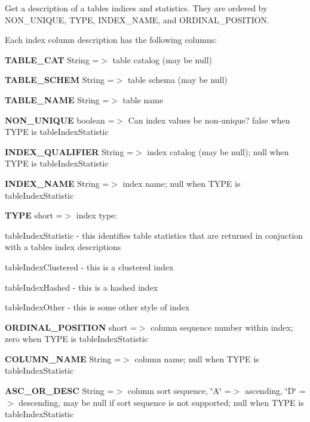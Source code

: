 Get a description of a table\textquotesingle{}s indices and statistics. They are ordered by N\+O\+N\+\_\+\+U\+N\+I\+Q\+UE, T\+Y\+PE, I\+N\+D\+E\+X\+\_\+\+N\+A\+ME, and O\+R\+D\+I\+N\+A\+L\+\_\+\+P\+O\+S\+I\+T\+I\+ON. 

Each index column description has the following columns\+: 
\begin{DoxyEnumerate}
\item {\bfseries T\+A\+B\+L\+E\+\_\+\+C\+AT} String =$>$ table catalog (may be null) 
\item {\bfseries T\+A\+B\+L\+E\+\_\+\+S\+C\+H\+EM} String =$>$ table schema (may be null) 
\item {\bfseries T\+A\+B\+L\+E\+\_\+\+N\+A\+ME} String =$>$ table name 
\item {\bfseries N\+O\+N\+\_\+\+U\+N\+I\+Q\+UE} boolean =$>$ Can index values be non-\/unique? false when T\+Y\+PE is table\+Index\+Statistic 
\item {\bfseries I\+N\+D\+E\+X\+\_\+\+Q\+U\+A\+L\+I\+F\+I\+ER} String =$>$ index catalog (may be null); null when T\+Y\+PE is table\+Index\+Statistic 
\item {\bfseries I\+N\+D\+E\+X\+\_\+\+N\+A\+ME} String =$>$ index name; null when T\+Y\+PE is table\+Index\+Statistic 
\item {\bfseries T\+Y\+PE} short =$>$ index type\+: 
\begin{DoxyItemize}
\item table\+Index\+Statistic -\/ this identifies table statistics that are returned in conjuction with a table\textquotesingle{}s index descriptions 
\item table\+Index\+Clustered -\/ this is a clustered index 
\item table\+Index\+Hashed -\/ this is a hashed index 
\item table\+Index\+Other -\/ this is some other style of index 
\end{DoxyItemize}
\item {\bfseries O\+R\+D\+I\+N\+A\+L\+\_\+\+P\+O\+S\+I\+T\+I\+ON} short =$>$ column sequence number within index; zero when T\+Y\+PE is table\+Index\+Statistic 
\item {\bfseries C\+O\+L\+U\+M\+N\+\_\+\+N\+A\+ME} String =$>$ column name; null when T\+Y\+PE is table\+Index\+Statistic 
\item {\bfseries A\+S\+C\+\_\+\+O\+R\+\_\+\+D\+E\+SC} String =$>$ column sort sequence, \char`\"{}\+A\char`\"{} =$>$ ascending, \char`\"{}\+D\char`\"{} =$>$ descending, may be null if sort sequence is not supported; null when T\+Y\+PE is table\+Index\+Statistic 

\end{DoxyEnumerate}
